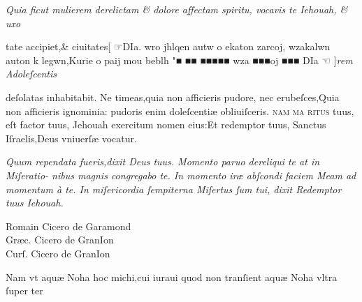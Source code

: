 \documentclass{article}
\newcommand{\threecolumntypefacenames}[3]{\begin{multicols}{3}
		\tiny
		\hfill \qquad \qquad \qquad \qquad #1\hspace*{\fill}\\
		\columnbreak
		\hfill #2\hspace*{\fill}\\
		\columnbreak
		\hfill #3\qquad \qquad \qquad \qquad \hspace*{\fill}
\end{multicols}}
\newcommand{\greektext}{\grecs wro jhlqen autw o ekaton zarcoj, wzakalwn auton k legwn,Kurie o paij mou beblh "\normalfont}
\begin{document}
{\begin{multicols}{2}
	\columnbreak
	\fontsize{8}{9}\selectfont
	\justifying
	\noindent
	\textit{Quia ficut mulierem derelictam \& dolore affectam spiritu, vocavis te Iehouah, \& uxo}
\end{multicols}
\fontsize{8}{9}\selectfont
\vspace{-2.3\baselineskip}
\noindent tate accipiet,\& ciuitates\hfill\hfill {\normalsize [ ☞}\hfill \grecs DIa. \greektext ■ ■■ ■■■■■ \grecs wza ■■■oj ■■■ DIa \normalfont \hfill{\normalsize ☜ ]}\hfill \textit{rem Adoleſcentis}
\vspace{-1.2\baselineskip}
\begin{multicols}{2}
	\fontsize{8}{9}\selectfont
	\justifying
	\noindent deſolatas inhabitabit. Ne timeas,quia non afficieris pudore, nec erubeſces,Quia\linebreak
	non afficieris ignominia: pudoris enim doleſcenti\ae{} obliuiſceris. \textsc{nam ma\linebreak
		ritus} tuus, eſt factor tuus, Jehouah exercitum nomen eius:Et redemptor tuus,\linebreak
	Sanctus Iſraelis,Deus vniuerſ\ae{} vocatur.

	\columnbreak
	\fontsize{8}{9}\selectfont
	\justifying
	\noindent
	\textit{Quum rependata fueris,dixit Deus tuus. Momento paruo dereliqui te at in Miſeratio-\linebreak
		nibus magnis congregabo te. In momento ir\ae{} abſcondi faciem Meam ad momentum \`a te.\linebreak
		In miſericordia ſempiterna Miſertus ſum tui, dixit Redemptor tuus Iehouah.}
\end{multicols}
\threecolumntypefacenames{Romain Cicero de Garamond}{Gr\ae{}c. Cicero de GranIon}{Curſ. Cicero de GranIon}
\vspace{-2.5\baselineskip}
\begin{multicols}{2}
	\fontsize{7}{8}\selectfont
	\justifying
	\noindent \quad Nam vt aqu\ae{} Noha hoc michi,cui iuraui quod non tranſient aqu\ae{} Noha vltra ſuper ter\linebreak


\end{multicols}}
\end{document}
